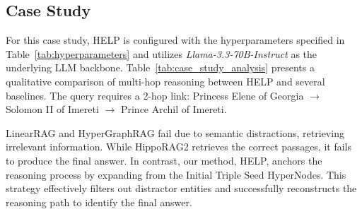 \newpage
\subsection{Case Study}\label{appendix: case study}

For this case study, HELP is configured with the hyperparameters specified in Table~\ref{tab:hyperparameters} and utilizes \textit{Llama-3.3-70B-Instruct} as the underlying LLM backbone. Table~\ref{tab:case_study_analysis} presents a qualitative comparison of multi-hop reasoning between HELP and several baselines. The query requires a 2-hop link: Princess Elene of Georgia $\to$ Solomon II of Imereti $\to$ Prince Archil of Imereti.

LinearRAG and HyperGraphRAG fail due to semantic distractions, retrieving irrelevant information. While HippoRAG2 retrieves the correct passages, it fails to produce the final answer. In contrast, our method, HELP, anchors the reasoning process by expanding from the Initial Triple Seed HyperNodes. This strategy effectively filters out distractor entities and successfully reconstructs the reasoning path to identify the final answer.

\newcommand{\cmark}{\textcolor{cgreen}{\ding{51}}} %
\newcommand{\xmark}{\textcolor{cred}{\ding{55}}}   %




